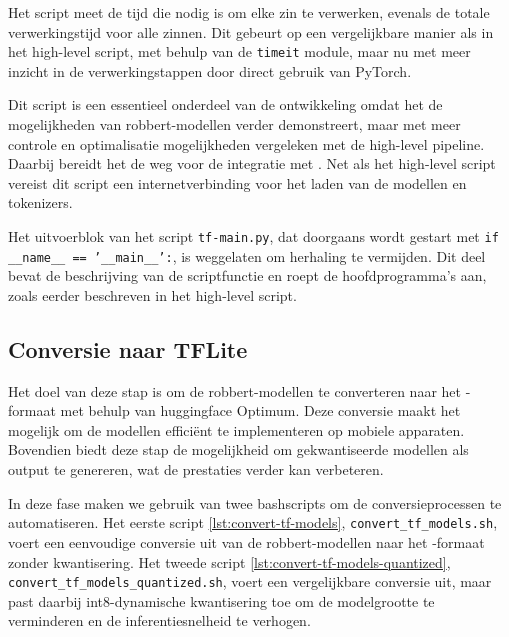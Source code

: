 Het script meet de tijd die nodig is om elke zin te verwerken, evenals de totale verwerkingstijd voor alle zinnen. Dit gebeurt op een vergelijkbare manier als in het high-level script, met behulp van de \texttt{timeit} module, maar nu met meer inzicht in de verwerkingstappen door direct gebruik van PyTorch.

Dit script is een essentieel onderdeel van de ontwikkeling omdat het de mogelijkheden van \gls{robbert}-modellen verder demonstreert, maar met meer controle en optimalisatie mogelijkheden vergeleken met de high-level pipeline. Daarbij bereidt het de weg voor de integratie met . Net als het high-level script vereist dit script een internetverbinding voor het laden van de modellen en tokenizers.

Het uitvoerblok van het script \texttt{tf-main.py}, dat doorgaans wordt gestart met \texttt{if \_\_name\_\_ == '\_\_main\_\_':}, is weggelaten om herhaling te vermijden. Dit deel bevat de beschrijving van de scriptfunctie en roept de hoofdprogramma's aan, zoals eerder beschreven in het high-level script.

\subsection{Conversie naar TFLite}

Het doel van deze stap is om de \gls{robbert}-modellen te converteren naar het -formaat met behulp van \gls{huggingface} Optimum. Deze conversie maakt het mogelijk om de modellen efficiënt te implementeren op mobiele apparaten. Bovendien biedt deze stap de mogelijkheid om gekwantiseerde modellen als output te genereren, wat de prestaties verder kan verbeteren.

In deze fase maken we gebruik van twee bashscripts om de conversieprocessen te automatiseren. Het eerste script \ref{lst:convert-tf-models}, \texttt{convert\_tf\_models.sh}, voert een eenvoudige conversie uit van de \gls{robbert}-modellen naar het -formaat zonder kwantisering. Het tweede script \ref{lst:convert-tf-models-quantized}, \texttt{convert\_tf\_models\_quantized.sh}, voert een vergelijkbare conversie uit, maar past daarbij int8-dynamische kwantisering toe om de modelgrootte te verminderen en de inferentiesnelheid te verhogen.

